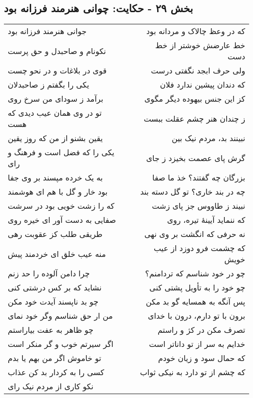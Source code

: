\begin{center}
\section*{بخش ۲۹ - حکایت: چوانی هنرمند فرزانه بود}
\label{sec:029}
\begin{longtable}{l p{0.5cm} r}
جوانی هنرمند فرزانه بود
&&
که در وعظ چالاک و مردانه بود
\\
نکونام و صاحبدل و حق پرست
&&
خط عارضش خوشتر از خط دست
\\
قوی در بلاغات و در نحو چست
&&
ولی حرف ابجد نگفتی درست
\\
یکی را بگفتم ز صاحبدلان
&&
که دندان پیشین ندارد فلان
\\
برآمد ز سودای من سرخ روی
&&
کز این جنس بیهوده دیگر مگوی
\\
تو در وی همان عیب دیدی که هست
&&
ز چندان هنر چشم عقلت ببست
\\
یقین بشنو از من که روز یقین
&&
نبینند بد، مردم نیک بین
\\
یکی را که فضل است و فرهنگ و رای
&&
گرش پای عصمت بخیزد ز جای
\\
به یک خرده مپسند بر وی جفا
&&
بزرگان چه گفتند؟ خذ ما صفا
\\
بود خار و گل با هم ای هوشمند
&&
چه در بند خاری؟ تو گل دسته بند
\\
که را زشت خویی بود در سرشت
&&
نبیند ز طاووس جز پای زشت
\\
صفایی به دست آور ای خیره روی
&&
که ننماید آیینهٔ تیره، روی
\\
طریقی طلب کز عقوبت رهی
&&
نه حرفی که انگشت بر وی نهی
\\
منه عیب خلق ای خردمند پیش
&&
که چشمت فرو دوزد از عیب خویش
\\
چرا دامن آلوده را حد زنم
&&
چو در خود شناسم که تردامنم؟
\\
نشاید که بر کس درشتی کنی
&&
چو خود را به تأویل پشتی کنی
\\
چو بد ناپسند آیدت خود مکن
&&
پس آنگه به همسایه گو بد مکن
\\
من ار حق شناسم وگر خود نمای
&&
برون با تو دارم، درون با خدای
\\
چو ظاهر به عفت بیاراستم
&&
تصرف مکن در کژ و راستم
\\
اگر سیرتم خوب و گر منکر است
&&
خدایم به سر از تو داناتر است
\\
تو خاموش اگر من بهم یا بدم
&&
که حمال سود و زیان خودم
\\
کسی را به کردار بد کن عذاب
&&
که چشم از تو دارد به نیکی ثواب
\\
نکو کاری از مردم نیک رای

\end{longtable}
\end{center}
